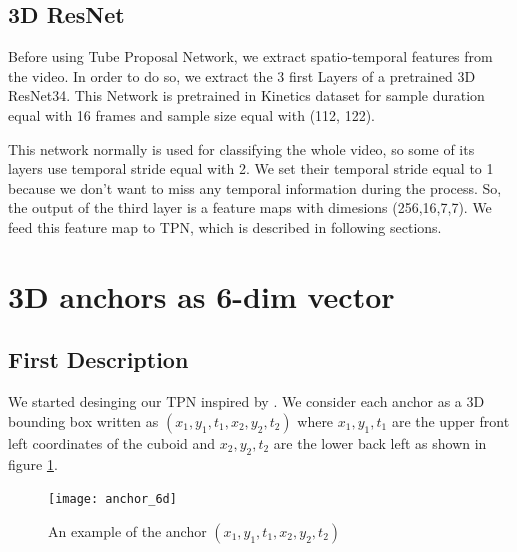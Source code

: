 \subsection{3D ResNet}
Before using Tube Proposal Network, we extract spatio-temporal features from the video. In order to do so, we extract the 3 first Layers of a
pretrained 3D ResNet34. This Network is pretrained in Kinetics dataset \cite{DBLP:journals/corr/KayCSZHVVGBNSZ17} for sample duration
equal with 16  frames and sample size equal with (112, 122). \par
This network normally is used for classifying the whole video, so some of its layers use temporal stride equal with 2.
We set their temporal stride equal to 1 because we don't want to miss any temporal information during the process.
So, the output of the third layer is a feature maps with dimesions (256,16,7,7). We feed this feature map to TPN, which is described
in following sections.

\section{ 3D anchors as 6-dim vector}
\subsection{First Description}
We started desinging our TPN inspired by \cite{DBLP:journals/corr/HouCS17}. We consider each anchor as a 3D bounding box written as
$(x_1, y_1, t_1, x_2, y_2, t_2)$ where $x_1, y_1, t_1$
are the upper front left coordinates of the cuboid and $x_2, y_2, t_2$ are the lower back left as shown in figure \ref{fig:anchor_6d}.
\begin{figure}[h]
  \centering
  \texttt{[image: anchor\_6d]}
  \caption{An example of the anchor $(x_1,y_1,t_1,x_2,y_2,t_2)$}
  \label{fig:anchor_6d}
\end{figure}

